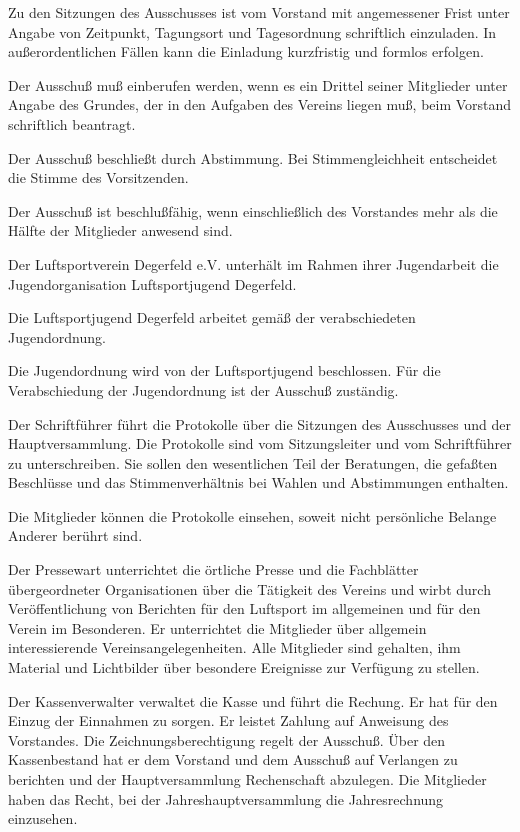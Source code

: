 \documentclass[10pt,a4paper,parskip=half]{scrartcl}
\begin{document}
\begin{contract}
    Zu den Sitzungen des Ausschusses ist vom Vorstand mit angemessener Frist unter Angabe von Zeitpunkt,
    Tagungsort und Tagesordnung schriftlich einzuladen.
    In außerordentlichen Fällen kann die Einladung kurzfristig und formlos erfolgen.
    
    Der Ausschuß muß einberufen werden,
    wenn es ein Drittel seiner Mitglieder unter Angabe des Grundes,
    der in den Aufgaben des Vereins liegen muß,
    beim Vorstand schriftlich beantragt.
    
    Der Ausschuß beschließt durch Abstimmung.
    Bei Stimmengleichheit entscheidet die Stimme des Vorsitzenden.
    
    Der Ausschuß ist beschlußfähig,
    wenn einschließlich des Vorstandes mehr als die Hälfte der Mitglieder anwesend sind.
    
    Der Luftsportverein Degerfeld e.V. unterhält im Rahmen ihrer Jugendarbeit die Jugendorganisation Luftsportjugend Degerfeld.
    
    Die Luftsportjugend Degerfeld arbeitet gemäß der verabschiedeten Jugendordnung.
    
    Die Jugendordnung wird von der Luftsportjugend beschlossen. Für die Verabschiedung der Jugendordnung ist der Ausschuß zuständig.
    
    Der Schriftführer führt die Protokolle über die Sitzungen des Ausschusses und der Hauptversammlung.
    Die Protokolle sind vom Sitzungsleiter und vom Schriftführer zu unterschreiben.
    Sie sollen den wesentlichen Teil der Beratungen,
    die gefaßten Beschlüsse und das Stimmenverhältnis bei Wahlen und Abstimmungen enthalten.
    
    Die Mitglieder können die Protokolle einsehen,
    soweit nicht persönliche Belange Anderer berührt sind.
    
    Der Pressewart unterrichtet die örtliche Presse und die Fachblätter übergeordneter Organisationen über die Tätigkeit des Vereins und wirbt durch Veröffentlichung von Berichten für den Luftsport im allgemeinen und für den Verein im Besonderen.
    Er unterrichtet die Mitglieder über allgemein interessierende Vereinsangelegenheiten.
    Alle Mitglieder sind gehalten, ihm Material und Lichtbilder über besondere Ereignisse zur Verfügung zu stellen.
    
    Der Kassenverwalter verwaltet die Kasse und führt die Rechung.
    Er hat für den Einzug der Einnahmen zu sorgen.
    Er leistet Zahlung auf Anweisung des Vorstandes.
    Die Zeichnungsberechtigung regelt der Ausschuß.
    Über den Kassenbestand hat er dem Vorstand und dem Ausschuß auf Verlangen zu berichten und der Hauptversammlung Rechenschaft abzulegen.
    Die Mitglieder haben das Recht,
    bei der Jahreshauptversammlung die Jahresrechnung einzusehen.
    

\end{contract}
\end{document}
